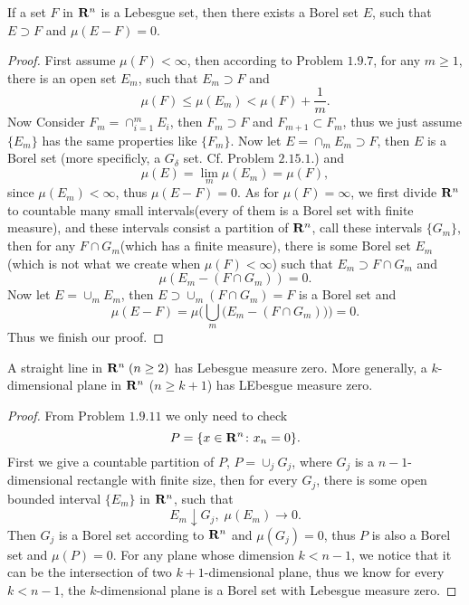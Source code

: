 \begin{pro}%
	If a set $F$ in $\mathbf{R}^n$ is a Lebesgue set, then there exists a Borel set $E$, such that $E\supset F$ and $\mu(E-F)=0$.
\end{pro}
\begin{proof}
	First assume $\mu(F)<\infty$, then according to Problem $1.9.7$, for any $m\geq 1$, there is an open set $E_m$, such that
	$E_m\supset F$ and 
	\[\mu(F)\leq \mu(E_m)<\mu(F)+\frac{1}{m}.\]
	 Now Consider $F_m=\cap_{i=1}^m E_i$, then $F_m\supset F$ and $F_{m+1}\subset F_{m}$, thus we just assume $\{E_m\}$ has the same properties like $\{F_m\}$. Now let $E=\cap_m E_m\supset F$, then $E$ is a Borel set (more specificly, a $G_{\delta}$ set. Cf. Problem $2.15.1$.) and
	\[\mu(E)=\lim_m \mu(E_m)=\mu(F),\]
	since $\mu(E_m)<\infty$, thus $\mu(E-F)=0$. As for $\mu(F)=\infty$, we first divide $\mathbf{R}^n$ to countable many small intervals(every of them is a Borel set with finite measure), and these intervals consist a partition of $\mathbf{R}^n$, call these intervals $\{G_m\}$, then for any $F\cap G_m$(which has a finite measure), there is some Borel set $E_m$(which is not what we create when $\mu(F)<\infty$) such that $E_m\supset F\cap G_m$ and
	\[\mu(E_m-(F\cap G_m))=0.\]
	Now let $E=\cup_m E_m$, then $E\supset \cup_m(F\cap G_m)=F$ is a Borel set and 
	\[\mu(E-F)=\mu\bigg(\bigcup_m \big(E_m-(F\cap G_m)\big)\bigg)=0.\]
	Thus we finish our proof.
\end{proof}

\begin{pro}%
	A straight line in $\mathbf{R}^n\;(n\geq 2)$ has Lebesgue measure zero. More generally, a $k$-dimensional plane in $\mathbf{R}^n$ ($n\geq k+1$) has LEbesgue measure zero.
\end{pro}
\begin{proof}
	From Problem $1.9.11$ we only need to check
	\[P=\{x\in\mathbf{R}^n\colon x_n=0\}.\]
	First we give a countable partition of $P$, $P=\cup_j G_j$, where $G_j$ is a $n-1$-dimensional rectangle with finite size, then for every $G_j$, there is some open bounded interval $\{E_m\}$ in $\mathbf{R}^n$, such that
	\[E_m\downarrow G_j,\;\mu(E_m)\to 0.\]
	Then $G_j$ is a Borel set according to $\mathbf{R}^n$ and $\mu(G_j)=0$, thus $P$ is also a Borel set and $\mu(P)=0$.
	For any plane whose dimension $k<n-1$, we notice that it can be the intersection of two $k+1$-dimensional plane, thus we know for every $k<n-1$, the $k$-dimensional plane is a Borel set with Lebesgue measure zero.
\end{proof}


